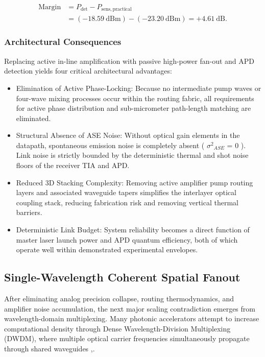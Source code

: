 \documentclass[journal]{IEEEtran}
\begin{document}
\begin{equation}
\begin{aligned}
\mathrm{Margin}
&= P_{\mathrm{det}} - P_{\mathrm{sens,practical}} \\
&= (-18.59~\mathrm{dBm}) - (-23.20~\mathrm{dBm})
= +4.61~\mathrm{dB}.
\end{aligned}
\end{equation}

\subsubsection{\textbf{Architectural Consequences}}

Replacing active in-line amplification with passive high-power fan-out and APD detection yields four critical architectural advantages:

\begin{itemize}
\item Elimination of Active Phase-Locking: Because no intermediate pump waves or four-wave mixing processes occur within the routing fabric, all requirements for active phase distribution and sub-micrometer path-length matching are eliminated.
\item Structural Absence of ASE Noise: Without optical gain elements in the datapath, spontaneous emission noise is completely absent ( ${\sigma^{2}}_{ASE}$ = 0 ). Link noise is strictly bounded by the deterministic thermal and shot noise floors of the receiver TIA and APD.
\item Reduced 3D Stacking Complexity: Removing active amplifier pump routing layers and associated waveguide tapers simplifies the interlayer optical coupling stack, reducing fabrication risk and removing vertical thermal barriers.
\item Deterministic Link Budget: System reliability becomes a direct function of master laser launch power and APD quantum efficiency, both of which operate well within demonstrated experimental envelopes.
\end{itemize}

\subsection{\textbf{Single-Wavelength Coherent Spatial Fanout}}

After eliminating analog precision collapse, routing thermodynamics, and amplifier noise accumulation, the next major scaling contradiction emerges from wavelength-domain multiplexing. Many photonic accelerators attempt to increase computational density through Dense Wavelength-Division Multiplexing (DWDM), where multiple optical carrier frequencies simultaneously propagate through shared waveguides \cite{Cotter1999},\cite{Miscuglio2020}.
\end{document}
